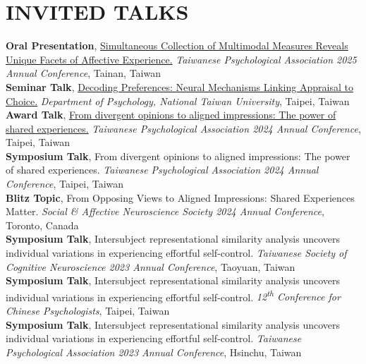 \documentclass[a4paper,12pt]{article}
\newcommand{\sectionspace}{0pt} %
\newcommand{\itemspace}{7pt} %
\begin{document}
\vspace{\sectionspace}

\section*{INVITED TALKS}
\textbf{Oral Presentation}, \href{https://drive.google.com/file/d/1gzteA8rduKYrEWR7e6y21c19jAAKienE/view?pli=1}{Simultaneous Collection of Multimodal Measures Reveals Unique Facets of Affective Experience.} \textit{Taiwanese Psychological Association 2025 Annual Conference}, Tainan, Taiwan \\[\itemspace]
\textbf{Seminar Talk}, \href{http://www.psy.ntu.edu.tw/index.php/homepage/speech/2903-1131127}{Decoding Preferences: Neural Mechanisms Linking Appraisal to Choice.} \textit{Department of Psychology, National Taiwan University}, Taipei, Taiwan \\[\itemspace]
\textbf{Award Talk}, \href{https://github.com/Ben-FCC/Ben-FCC_CV/blob/main/assets/2024_TPA_Oral.pdf}{From divergent opinions to aligned impressions: The power of shared experiences.}  \textit{Taiwanese Psychological Association 2024 Annual Conference}, Taipei, Taiwan \\[\itemspace]
\textbf{Symposium Talk}, From divergent opinions to aligned impressions: The power of shared experiences.  \textit{Taiwanese Psychological Association 2024 Annual Conference}, Taipei, Taiwan \\[\itemspace]
\textbf{Blitz Topic},  From Opposing Views to Aligned Impressions: Shared Experiences Matter.  \textit{Social \& Affective Neuroscience Society 2024 Annual Conference}, Toronto, Canada \\[\itemspace]
\textbf{Symposium Talk}, Intersubject representational similarity analysis uncovers individual variations in experiencing effortful self-control. \textit{Taiwanese Society of Cognitive Neuroscience 2023 Annual Conference}, Taoyuan, Taiwan \\[\itemspace]
\textbf{Symposium Talk}, Intersubject representational similarity analysis uncovers individual variations in experiencing effortful self-control.  \textit{12\textsuperscript{th} Conference for Chinese Psychologists}, Taipei, Taiwan \\[\itemspace]
\textbf{Symposium Talk}, Intersubject representational similarity analysis uncovers individual variations in experiencing effortful self-control.  \textit{Taiwanese Psychological Association 2023 Annual Conference}, Hsinchu, Taiwan \\[\itemspace]
\end{document}
